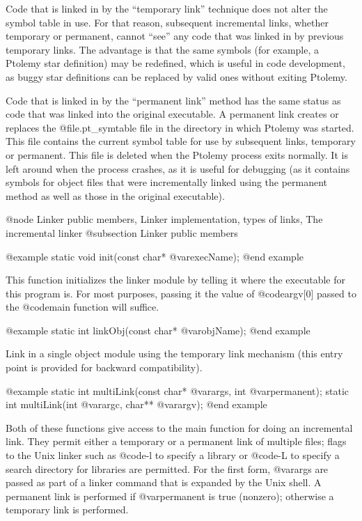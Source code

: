 Code that is linked in by the ``temporary link'' technique does not
alter the symbol table in use.  For that reason, subsequent incremental
links, whether temporary or permanent, cannot ``see'' any code that
was linked in by previous temporary links.  The advantage is that the
same symbols (for example, a Ptolemy star definition) may be redefined,
which is useful in code development, as buggy star definitions can be
replaced by valid ones without exiting Ptolemy.

Code that is linked in by the ``permanent link'' method has the same
status as code that was linked into the original executable.  A
permanent link creates or replaces the @file{.pt_symtable} file in
the directory in which Ptolemy was started.  This file contains the
current symbol table for use by subsequent links, temporary or
permanent.  This file is deleted when the Ptolemy process exits
normally.  It is left around when the process crashes, as it is useful
for debugging (as it contains symbols for object files that were
incrementally linked using the permanent method as well as those in
the original executable).

@node Linker public members, Linker implementation, types of links, The incremental linker
@subsection Linker public members


@example
static void init(const char* @var{execName});
@end example

This function initializes the linker module by telling it where the
executable for this program is.  For most purposes, passing it the
value of @code{argv[0]} passed to the @code{main} function will
suffice.

@example
static int linkObj(const char* @var{objName});
@end example

Link in a single object module using the temporary link mechanism
(this entry point is provided for backward compatibility).

@example
static int multiLink(const char* @var{args}, int @var{permanent});
static int multiLink(int @var{argc}, char** @var{argv});
@end example

Both of these functions give access to the main function for doing
an incremental link.  They permit either a temporary or a permanent
link of multiple files; flags to the Unix linker such as @code{-l}
to specify a library or @code{-L} to specify a search directory for
libraries are permitted.  For the first form, @var{args} are passed
as part of a linker command that is expanded by the Unix shell.  A
permanent link is performed if @var{permanent} is true (nonzero);
otherwise a temporary link is performed.

